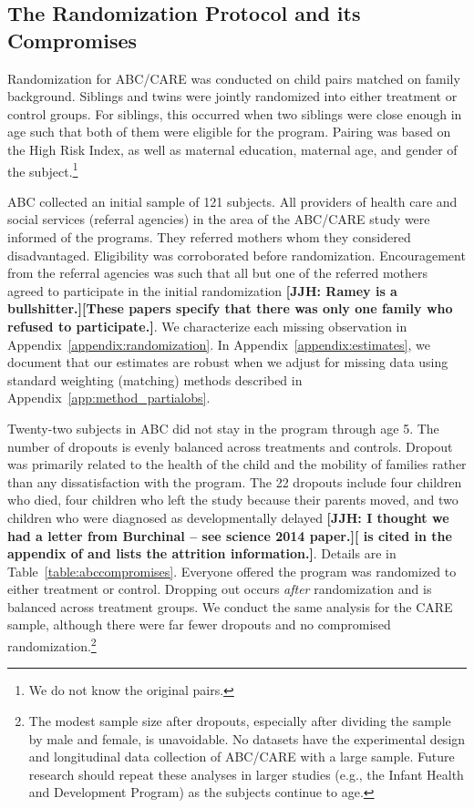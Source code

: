 \subsection{The Randomization Protocol and its Compromises} \label{section:randomization}

Randomization for ABC/CARE was conducted on child pairs matched on family background. Siblings and twins were jointly randomized into either treatment or control groups. For siblings, this occurred when two siblings were close enough in age such that both of them were eligible for the program. Pairing was based on the High Risk Index, as well as maternal education, maternal age, and gender of the subject.\footnote{We do not know the original pairs.} 

ABC collected an initial sample of 121 subjects. All providers of health care and social services (referral agencies) in the area of the ABC/CARE study were informed of the programs. They referred mothers whom they considered disadvantaged. Eligibility was corroborated before randomization. Encouragement from the referral agencies was such that all but one of the referred mothers agreed to participate in the initial randomization \citep{Ramey_Yeates_Short_1984_CD,Campbell_Ramey_1995_AERJ} \textbf{[JJH: Ramey is a bullshitter.][These papers specify that there was only one family who refused to participate.]}. We characterize each missing observation in Appendix~\ref{appendix:randomization}. In Appendix~\ref{appendix:estimates}, we document that our estimates are robust when we adjust for missing data using standard weighting (matching) methods described in Appendix~\ref{app:method_partialobs}. 

Twenty-two subjects in ABC did not stay in the program through age 5. The number of dropouts is evenly balanced across treatments and controls. Dropout was primarily related to the health of the child and the mobility of families rather than any dissatisfaction with the program. The 22 dropouts include four children who died, four children who left the study because their parents moved, and two children who were diagnosed as developmentally delayed \citep{Burchinal_Campbell_etal_1997_CD} \textbf{[JJH: I thought we had a letter from Burchinal -- see science 2014 paper.][\citet{Burchinal_Campbell_etal_1997_CD}  is cited in the appendix of \citet{Campbell_Conti_etal_2014_EarlyChildhoodInvestments} and lists the attrition information.]}. Details are in Table~\ref{table:abccompromises}. Everyone offered the program was randomized to either treatment or control. Dropping out occurs \emph{after} randomization and is balanced across treatment groups. We conduct the same analysis for the CARE sample, although there were far fewer dropouts and no compromised randomization.\footnote{The modest sample size after dropouts, especially after dividing the sample by male and female, is unavoidable. No datasets have the experimental design and longitudinal data collection of ABC/CARE with a large sample. Future research should repeat these analyses in larger studies (e.g., the Infant Health and Development Program) as the subjects continue to age.} 

